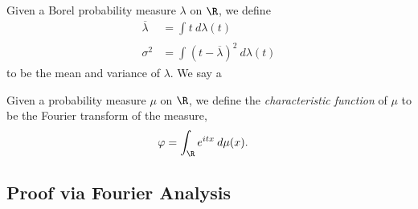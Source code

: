 \documentclass[10pt]{mypackage}
\begin{document}
\begin{definition}
  Given a Borel probability measure $\lambda$ on $\R$, we define
  \begin{align*}
    \overline{\lambda} &= \int_{}^{} t\:d\lambda(t)\\
    \sigma^2 &= \int_{}^{} \left( t- \overline{\lambda} \right)^2\:d\lambda(t)
  \end{align*}
  to be the mean and variance of $\lambda$. We say a 
\end{definition}
\begin{definition}
Given a probability measure $\mu$ on $\R$, we define the \textit{characteristic function} of $\mu$ to be the Fourier transform of the measure,
\begin{align*}
  \varphi &= \int_{\R}^{} e^{itx}\:d\mu(x).
\end{align*}
  
\end{definition}

\subsection{Proof via Fourier Analysis}%
\end{document}
